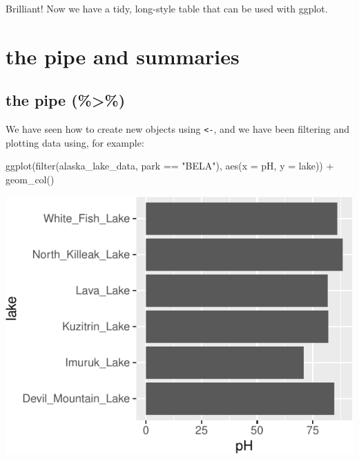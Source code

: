 \documentclass[
]{krantz}
\newenvironment{Shaded}{\begin{snugshade}}{\end{snugshade}}
\newcommand{\AttributeTok}[1]{\textcolor[rgb]{0.77,0.63,0.00}{#1}}
\newcommand{\FunctionTok}[1]{\textcolor[rgb]{0.00,0.00,0.00}{#1}}
\newcommand{\NormalTok}[1]{#1}
\newcommand{\SpecialCharTok}[1]{\textcolor[rgb]{0.00,0.00,0.00}{#1}}
\newcommand{\StringTok}[1]{\textcolor[rgb]{0.31,0.60,0.02}{#1}}
\begin{document}
Brilliant! Now we have a tidy, long-style table that can be used with ggplot.

\hypertarget{the-pipe-and-summaries}{%
\section*{the pipe and summaries}\label{the-pipe-and-summaries}}

\hypertarget{the-pipe}{%
\subsection{the pipe (\%\textgreater\%)}\label{the-pipe}}

We have seen how to create new objects using \texttt{\textless{}-}, and we have been filtering and plotting data using, for example:

\begin{Shaded}
\begin{Highlighting}[]
\FunctionTok{ggplot}\NormalTok{(}\FunctionTok{filter}\NormalTok{(alaska\_lake\_data, park }\SpecialCharTok{==} \StringTok{"BELA"}\NormalTok{), }\FunctionTok{aes}\NormalTok{(}\AttributeTok{x =}\NormalTok{ pH, }\AttributeTok{y =}\NormalTok{ lake)) }\SpecialCharTok{+} \FunctionTok{geom\_col}\NormalTok{()}
\end{Highlighting}
\end{Shaded}

\begin{center}\includegraphics[width=1\linewidth]{index_files/figure-latex/unnamed-chunk-72-1} \end{center}
\end{document}
